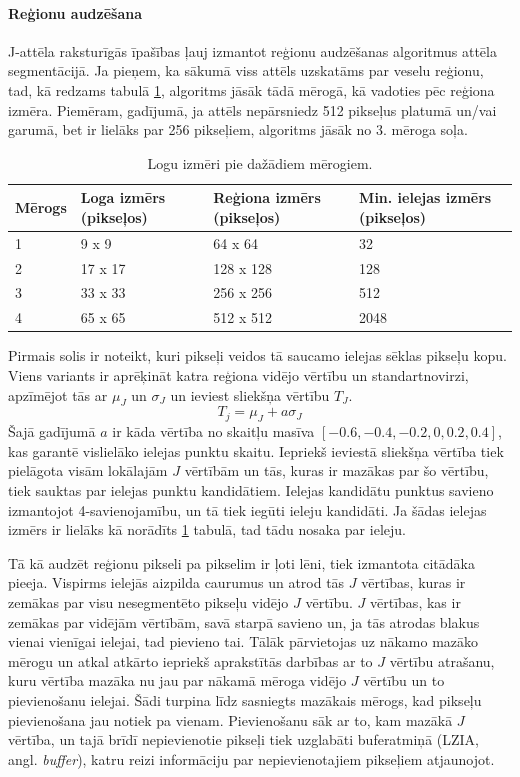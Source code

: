 \documentclass[12pt,paper=a4]{report}
\begin{document}
\paragraph{Reģionu audzēšana}J-attēla raksturīgās īpašības ļauj izmantot reģionu audzēšanas algoritmus attēla segmentācijā. Ja pieņem, ka sākumā viss attēls uzskatāms par veselu reģionu, tad, kā redzams tabulā \ref{tab:logiUnMerogi}, algoritms jāsāk tādā mērogā, kā vadoties pēc reģiona izmēra. Piemēram, gadījumā, ja attēls nepārsniedz 512 pikseļus platumā un/vai garumā, bet ir lielāks par 256 pikseļiem, algoritms jāsāk no 3. mēroga soļa. \cite{2unsupImSegm2001}\par
\begin{table}[!ht]
\centering
\caption{Logu izmēri pie dažādiem mērogiem.}
\label{tab:logiUnMerogi}
\begin{tabular}{|p{1.5cm}|p{3.8cm}|p{3.8cm}|p{3.8cm}|}
\hline
Mērogs&Loga izmērs (pikseļos)&Reģiona izmērs (pikseļos)&Min. ielejas izmērs (pikseļos)\\ \hline \hline
1&9 x 9&64 x 64&32 \\ \hline
2&17 x 17&128 x 128&128 \\ \hline
3&33 x 33&256 x 256&512 \\ \hline
4&65 x 65&512 x 512&2048 \\ \hline
\end{tabular}
\end{table}
Pirmais solis ir noteikt, kuri pikseļi veidos tā saucamo ielejas sēklas pikseļu kopu. Viens variants ir aprēķināt katra reģiona vidējo vērtību un standartnovirzi, apzīmējot tās ar $\mu_J$ un $\sigma_J$ un ieviest sliekšņa vērtību $T_J$. \[ T_j=\mu_J+a \sigma_J \] Šajā gadījumā $a$ ir kāda vērtība no skaitļu masīva $[-0.6, -0.4, -0.2, 0, 0.2, 0.4]$, kas garantē vislielāko ielejas punktu skaitu. Iepriekš ieviestā sliekšņa vērtība tiek pielāgota visām lokālajām $J$ vērtībām un tās, kuras ir mazākas par šo vērtību, tiek sauktas par ielejas punktu kandidātiem. Ielejas kandidātu punktus savieno izmantojot 4-savienojamību, un tā tiek iegūti ieleju kandidāti. Ja šādas ielejas izmērs ir lielāks kā norādīts \ref{tab:logiUnMerogi} tabulā, tad tādu nosaka par ieleju. \cite{1colImSegm1999}\par
Tā kā audzēt reģionu pikseli pa pikselim ir ļoti lēni, tiek izmantota citādāka pieeja. Vispirms ielejās aizpilda caurumus un atrod tās $J$ vērtības, kuras ir zemākas par visu nesegmentēto pikseļu vidējo $J$ vērtību. $J$ vērtības, kas ir zemākas par vidējām vērtībām, savā starpā savieno un, ja tās atrodas blakus vienai vienīgai ielejai, tad pievieno tai. Tālāk pārvietojas uz nākamo mazāko mērogu un atkal atkārto iepriekš aprakstītās darbības ar to $J$ vērtību atrašanu, kuru vērtība mazāka nu jau par nākamā mēroga vidējo $J$ vērtību un to pievienošanu ielejai. Šādi turpina līdz sasniegts mazākais mērogs, kad pikseļu pievienošana jau notiek pa vienam. Pievienošanu sāk ar to, kam mazākā $J$ vērtība, un tajā brīdī nepievienotie pikseļi tiek uzglabāti buferatmiņā (LZIA, angl. \textit{buffer}), katru reizi informāciju par nepievienotajiem pikseļiem atjaunojot. \cite{1colImSegm1999}\par
\end{document}
